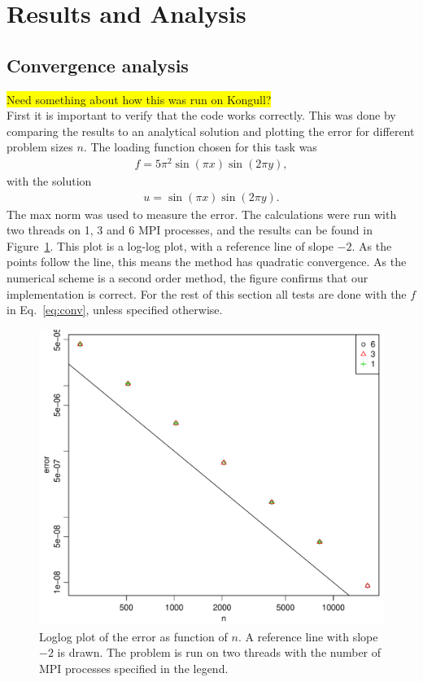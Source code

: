 \section{Results and Analysis}
%
\subsection{Convergence analysis}
\colorbox{yellow}{Need something about how this was run on Kongull?}\\
First it is important to verify that the code works correctly. This was done by comparing the results to an analytical solution and plotting the error for different problem sizes $n$. The loading function chosen for this task was 
\begin{align}
  \label{eq:conv} 
  f = 5 \pi^2 \sin (\pi x) \sin (2 \pi y),
\end{align}
with the solution
\begin{align}
  u = \sin (\pi x) \sin (2 \pi y). 
\end{align}
The max norm was used to measure the error. The calculations were run with two threads on 1, 3 and 6 MPI processes, and the results can be found in Figure~\ref{fig:errVsn}. This plot is a log-log plot, with a reference line of slope $-2$. As the points follow the line, this means the method has quadratic convergence. As the numerical scheme is a second order method, the figure confirms that our implementation is correct. For the rest of this section all tests are done with the $f$ in Eq.~\eqref{eq:conv}, unless specified otherwise.\\
%
\begin{figure}[h!]
\begin{center}
    \includegraphics[scale=0.4]{./Figures/errVsn.pdf}
\end{center}
  \vspace{-1\baselineskip}
\caption{Loglog plot of the error as function of $n$. A reference line with slope $-2$ is drawn. The problem is run on two threads with the number of MPI processes specified in the legend.}
\label{fig:errVsn}
\end{figure}
%
\\
